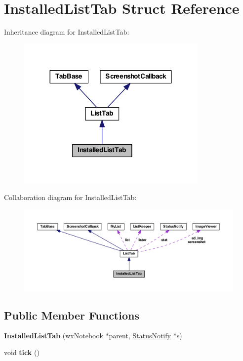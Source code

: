 \hypertarget{struct_installed_list_tab}{\section{Installed\-List\-Tab Struct Reference}
\label{struct_installed_list_tab}
}


Inheritance diagram for Installed\-List\-Tab\-:
\nopagebreak
\begin{figure}[H]
\begin{center}
\leavevmode
\includegraphics[width=264pt]{struct_installed_list_tab__inherit__graph}
\end{center}
\end{figure}


Collaboration diagram for Installed\-List\-Tab\-:
\nopagebreak
\begin{figure}[H]
\begin{center}
\leavevmode
\includegraphics[width=350pt]{struct_installed_list_tab__coll__graph}
\end{center}
\end{figure}
\subsection*{Public Member Functions}
\begin{DoxyCompactItemize}
\item 
\hypertarget{struct_installed_list_tab_ad6fb22213de354e358acd4a21d904586}{{\bfseries Installed\-List\-Tab} (wx\-Notebook $\ast$parent, \hyperlink{struct_status_notify}{Status\-Notify} $\ast$s)}\label{struct_installed_list_tab_ad6fb22213de354e358acd4a21d904586}

\item 
\hypertarget{struct_installed_list_tab_a79542db9b0a8cff839218b7b470feded}{void {\bfseries tick} ()}\label{struct_installed_list_tab_a79542db9b0a8cff839218b7b470feded}

\end{DoxyCompactItemize}


